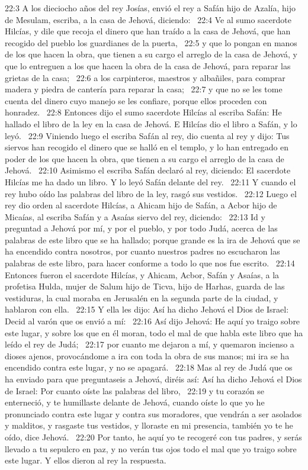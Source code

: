 22:3 A los dieciocho años del rey Josías, envió el rey a Safán hijo de Azalía, hijo de Mesulam, escriba, a la casa de Jehová, diciendo:  
22:4 Ve al sumo sacerdote Hilcías, y dile que recoja el dinero que han traído a la casa de Jehová, que han recogido del pueblo los guardianes de la puerta,  
22:5 y que lo pongan en manos de los que hacen la obra, que tienen a su cargo el arreglo de la casa de Jehová, y que lo entreguen a los que hacen la obra de la casa de Jehová, para reparar las grietas de la casa;  
22:6 a los carpinteros, maestros y albañiles, para comprar madera y piedra de cantería para reparar la casa;  
22:7 y que no se les tome cuenta del dinero cuyo manejo se les confiare, porque ellos proceden con honradez.  
22:8 Entonces dijo el sumo sacerdote Hilcías al escriba Safán: He hallado el libro de la ley en la casa de Jehová. E Hilcías dio el libro a Safán, y lo leyó.  
22:9 Viniendo luego el escriba Safán al rey, dio cuenta al rey y dijo: Tus siervos han recogido el dinero que se halló en el templo, y lo han entregado en poder de los que hacen la obra, que tienen a su cargo el arreglo de la casa de Jehová.  
22:10 Asimismo el escriba Safán declaró al rey, diciendo: El sacerdote Hilcías me ha dado un libro. Y lo leyó Safán delante del rey.  
22:11 Y cuando el rey hubo oído las palabras del libro de la ley, rasgó sus vestidos.  
22:12 Luego el rey dio orden al sacerdote Hilcías, a Ahicam hijo de Safán, a Acbor hijo de Micaías, al escriba Safán y a Asaías siervo del rey, diciendo:  
22:13 Id y preguntad a Jehová por mí, y por el pueblo, y por todo Judá, acerca de las palabras de este libro que se ha hallado; porque grande es la ira de Jehová que se ha encendido contra nosotros, por cuanto nuestros padres no escucharon las palabras de este libro, para hacer conforme a todo lo que nos fue escrito.  
22:14 Entonces fueron el sacerdote Hilcías, y Ahicam, Acbor, Safán y Asaías, a la profetisa Hulda, mujer de Salum hijo de Ticva, hijo de Harhas, guarda de las vestiduras, la cual moraba en Jerusalén en la segunda parte de la ciudad, y hablaron con ella.  
22:15 Y ella les dijo: Así ha dicho Jehová el Dios de Israel: Decid al varón que os envió a mí:  
22:16 Así dijo Jehová: He aquí yo traigo sobre este lugar, y sobre los que en él moran, todo el mal de que habla este libro que ha leído el rey de Judá;  
22:17 por cuanto me dejaron a mí, y quemaron incienso a dioses ajenos, provocándome a ira con toda la obra de sus manos; mi ira se ha encendido contra este lugar, y no se apagará.  
22:18 Mas al rey de Judá que os ha enviado para que preguntaseis a Jehová, diréis así: Así ha dicho Jehová el Dios de Israel: Por cuanto oíste las palabras del libro,  
22:19 y tu corazón se enterneció, y te humillaste delante de Jehová, cuando oíste lo que yo he pronunciado contra este lugar y contra sus moradores, que vendrán a ser asolados y malditos, y rasgaste tus vestidos, y lloraste en mi presencia, también yo te he oído, dice Jehová.  
22:20 Por tanto, he aquí yo te recogeré con tus padres, y serás llevado a tu sepulcro en paz, y no verán tus ojos todo el mal que yo traigo sobre este lugar. Y ellos dieron al rey la respuesta.  
